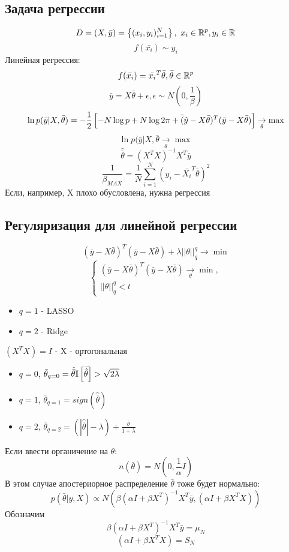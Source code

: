 \subsection*{Задача регрессии}
$$ D = (X, \bar{y}) = \left\{ (x_i, y_i)_{i=1}^N \right\}, \ x_i \in \mathbb{R}^p, y_i \in \mathbb{R} $$ 
$$ f(\bar{x_i}) \sim y_i $$
Линейная регрессия:
$$ f(\bar{x_i}) = \bar{x_i}^T \bar{\theta}, \bar{\theta} \in \mathbb{R}^p $$
$$  \bar{y} = X\bar{\theta} + \epsilon, \epsilon \sim N(0, \frac{1}{\beta})$$
$$ \ln p(\bar{y}| X, \bar{\theta}) = -\frac{1}{2} \left[ -N \log p + N\log 2\pi + \bar(\hat{y} - X\bar{\theta})^T(\bar{y} - X\bar{\theta}) \right] \underset{\theta}{\to} \max $$
$$  \ln p(\bar{y}|X, \bar{\theta} \underset{\theta}{\to} \max$$
$$ \hat{\bar{\theta}} = (X^TX)^{-1}X^T\bar{y} $$
$$ \frac{1}{\beta_{MAX}} = \frac{1}{N} \sum_{i=1}^N (y_i - \bar{X_i}^T \bar{\theta})^2$$
Если, например, X плохо обусловлена, нужна регрессия

\subsection*{Регуляризация для линейной регрессии}
$$ (\bar{y} - X\bar{\theta})^T(\bar{y} - X\bar{\theta}) + \lambda ||\theta||_q^q \to \min $$
$$ \begin{cases}
(\bar{y} - X\bar{\theta})^T (\bar{y} - X\bar{\theta}) \underset{\theta}{\to} \min, \\
||\theta||_q^q <t
\end{cases} $$
\begin{itemize}
	\item $q=1$ - LASSO
	\item $q=2$ - Ridge
\end{itemize}

$(X^TX) = I$ - X - ортогональная
\begin{itemize}
	\item $q=0$, $\bar{\theta}_{q=0} = \hat{\bar{\theta}}\mathbb{I}\left[ \bar{\hat{\theta}} \right]>\sqrt{2\lambda} $
	\item $q=1$, $\bar{\theta}_{q=1} = sign(\hat{\bar{\theta}})$
	\item $q=2$, $\bar{\theta}_{q=2} = (|\hat{\bar{\theta}}| - \lambda) + \frac{\bar{\theta}}{1+\lambda}$
\end{itemize}

Если ввести органичение на $\theta$: \\
$$ n(\bar{\theta}) = N(0, \frac{1}{\alpha}I) $$
В этом случае апостериорное распределение $\bar{\theta}$ тоже будет нормально:
$$ p(\bar{\theta}|y,X) \propto N(\beta(\alpha I + \beta X^T)^{-1}X^T\bar{y}, (\alpha I +\beta X^T X)) $$
Обозначим
$$\beta(\alpha I + \beta X^T)^{-1}X^T\bar{y} = \mu_N$$
$$ (\alpha I +\beta X^T X) = S_N $$

